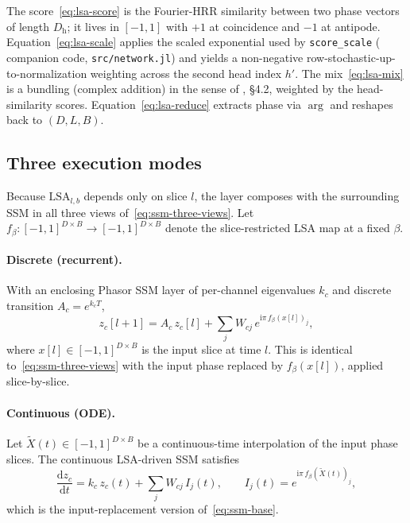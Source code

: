 \documentclass[11pt]{article}
\newcommand{\im}{\mathrm{i}}
\newcommand{\dd}{\mathrm{d}}
\newcommand{\Dh}{D_{\mathrm{h}}} %
\theoremstyle{definition}
\begin{document}
The score~\eqref{eq:lsa-score} is the Fourier-HRR similarity
between two phase vectors of length $\Dh$; it lives in $[-1, 1]$ with
$+1$ at coincidence and $-1$ at antipode. Equation~\eqref{eq:lsa-scale}
applies the scaled exponential used by \texttt{score\_scale}
(\cite{phasor-ssm-derivation} companion code, \texttt{src/network.jl})
and yields a non-negative row-stochastic-up-to-normalization weighting
across the second head index $h'$. The mix~\eqref{eq:lsa-mix} is a
bundling (complex addition) in the sense of \cite{phasor-ssm-derivation},
\S4.2, weighted by the head-similarity scores. Equation~\eqref{eq:lsa-reduce}
extracts phase via $\arg$ and reshapes back to $(D, L, B)$.

\subsection{Three execution modes}

Because $\mathrm{LSA}_{l,b}$ depends only on slice $l$, the layer
composes with the surrounding SSM in all three views of~\eqref{eq:ssm-three-views}.
Let $f_\beta\colon[-1,1]^{D\times B}\to[-1,1]^{D\times B}$ denote the
slice-restricted LSA map at a fixed $\beta$.

\paragraph{Discrete (recurrent).}
With an enclosing Phasor SSM layer of per-channel eigenvalues $k_c$ and
discrete transition $A_c = e^{k_c T}$,
\begin{equation}\label{eq:lsa-discrete}
  z_c[l+1] = A_c\,z_c[l] + \sum_j W_{cj}\,e^{\im\pi\,f_\beta(x[l])_j},
\end{equation}
where $x[l]\in[-1,1]^{D\times B}$ is the input slice at time $l$.
This is identical to~\eqref{eq:ssm-three-views} with the input phase
replaced by $f_\beta(x[l])$, applied slice-by-slice.

\paragraph{Continuous (ODE).}
Let $\tilde X(t)\in[-1,1]^{D\times B}$ be a continuous-time
interpolation of the input phase slices. The continuous LSA-driven SSM
satisfies
\begin{equation}\label{eq:lsa-continuous}
  \frac{\dd z_c}{\dd t}
    = k_c\,z_c(t) + \sum_j W_{cj}\,I_j(t),
  \qquad I_j(t) = e^{\im\pi\,f_\beta(\tilde X(t))_j},
\end{equation}
which is the input-replacement version of~\eqref{eq:ssm-base}.
\end{document}
